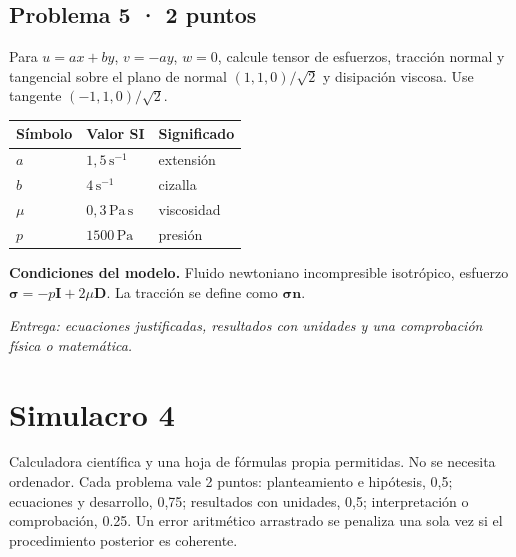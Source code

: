 \par\medskip\noindent\begin{minipage}{\linewidth}

\section{Problema 5 · 2 puntos}

Para $u=ax+by$, $v=-ay$, $w=0$, calcule tensor de esfuerzos, tracción normal y tangencial sobre el plano de normal $(1,1,0)/\sqrt2$ y disipación viscosa. Use tangente $(-1,1,0)/\sqrt2$.

\begin{tabular}{@{}p{.15\linewidth}p{.23\linewidth}p{.54\linewidth}@{}}
\toprule Símbolo & Valor SI & Significado\\\midrule
$a$ & $1{,}5\,\mathrm{s^{-1}}$ & extensión\\
$b$ & $4\,\mathrm{s^{-1}}$ & cizalla\\
$\mu$ & $0{,}3\,\mathrm{Pa\,s}$ & viscosidad\\
$p$ & $1500\,\mathrm{Pa}$ & presión\\
\bottomrule\end{tabular}

\par\medskip\textbf{Condiciones del modelo.} Fluido newtoniano incompresible isotrópico, esfuerzo $\boldsymbol\sigma=-p\boldsymbol I+2\mu\boldsymbol D$. La tracción se define como $\boldsymbol\sigma\boldsymbol n$.

\par\textit{Entrega: ecuaciones justificadas, resultados con unidades y una comprobación física o matemática.}

\end{minipage}\par\medskip


\chapter{Simulacro 4}


Calculadora científica y una hoja de fórmulas propia permitidas. No se necesita ordenador. Cada problema vale 2 puntos: planteamiento e hipótesis, 0,5; ecuaciones y desarrollo, 0,75; resultados con unidades, 0,5; interpretación o comprobación, 0.25. Un error aritmético arrastrado se penaliza una sola vez si el procedimiento posterior es coherente.


